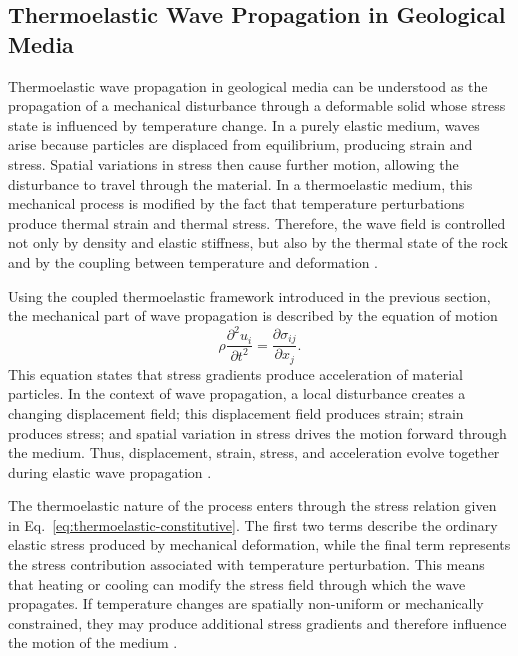 \subsection{Thermoelastic Wave Propagation in Geological Media}

Thermoelastic wave propagation in geological media can be understood as the propagation of a mechanical disturbance through a deformable solid whose stress state is influenced by temperature change. In a purely elastic medium, waves arise because particles are displaced from equilibrium, producing strain and stress. Spatial variations in stress then cause further motion, allowing the disturbance to travel through the material. In a thermoelastic medium, this mechanical process is modified by the fact that temperature perturbations produce thermal strain and thermal stress. Therefore, the wave field is controlled not only by density and elastic stiffness, but also by the thermal state of the rock and by the coupling between temperature and deformation \cite{aki2002,nowacki1986,boley1960}.

Using the coupled thermoelastic framework introduced in the previous section, the mechanical part of wave propagation is described by the equation of motion
\begin{equation}
\label{eq:eom}
\rho \frac{\partial^2 u_i}{\partial t^2}
=
\frac{\partial \sigma_{ij}}{\partial x_j}.
\end{equation}
This equation states that stress gradients produce acceleration of material particles. In the context of wave propagation, a local disturbance creates a changing displacement field; this displacement field produces strain; strain produces stress; and spatial variation in stress drives the motion forward through the medium. Thus, displacement, strain, stress, and acceleration evolve together during elastic wave propagation \cite{aki2002,jaeger2007}.

The thermoelastic nature of the process enters through the stress relation given in Eq.~\eqref{eq:thermoelastic-constitutive}. The first two terms describe the ordinary elastic stress produced by mechanical deformation, while the final term represents the stress contribution associated with temperature perturbation. This means that heating or cooling can modify the stress field through which the wave propagates. If temperature changes are spatially non-uniform or mechanically constrained, they may produce additional stress gradients and therefore influence the motion of the medium \cite{nowacki1986,boley1960}.

